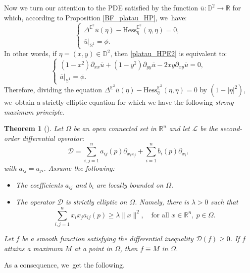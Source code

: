 \documentclass[10pt]{amsart}
\theoremstyle{plain}
\newtheorem{theorem}[cor]{Theorem}
\theoremstyle{definition}
\begin{document}
Now we turn our attention to the PDE satisfied by the function $\overline{u}:\mathbb{D}^2 \to \mathbb{R}$ for which, according to Proposition \ref{BF_platau_HP}, we~have:
\begin{equation}
\begin{cases}\label{platau_HPE2}
\Delta^{\mathbb{E}^2}\overline{u}(\eta) - \mathrm{Hess}_{\eta}^{\mathbb{E}^2}(\eta,\eta) = 0, \\
\overline{u}|_{\mathbb{S}^1} = \phi.
\end{cases}
\end{equation}
In other words, if $\eta = (x,y) \in \mathbb{D}^2$, then \eqref{platau_HPE2} is equivalent to:
\begin{equation}
\begin{cases}
(1-x^2)\partial_{xx}\overline{u} + (1-y^2)\partial_{yy}\overline{u} - 2xy\partial_{xy}\overline{u} = 0, \\
\overline{u}|_{\mathbb{S}^1} = \phi.
\end{cases}
\end{equation}
Therefore, dividing the equation $\Delta^{\mathbb{E}^2}\overline{u}(\eta) - \mathrm{Hess}_{\eta}^{\mathbb{E}^2}(\eta,\eta) = 0$ by $(1-\lvert\eta\rvert^2)$, we~obtain a strictly elliptic equation for which we have the following \emph{strong maximum principle}.

\begin{theorem}[{\cite[\S 3]{Protter1967MaximumPI}}]\label{Strong_Max_P}
Let $\Omega$ be an open connected set in $\mathbb{R}^n$ and let $\mathcal{L}$ be the second-order differential operator:
\[
\mathcal{D} = \sum_{i,j=1}^{n}a_{ij}(p)\partial_{x_ix_j} + \sum_{i=1}^nb_i(p)\partial_{x_i},
\]
with $a_{ij} = a_{ji}$. Assume the following:
\begin{itemize}
\item The coefficients $a_{ij}$ and $b_i$ are locally bounded on $\Omega$.
\item The operator $\mathcal{D}$ is \emph{strictly elliptic} on $\Omega$. Namely, there is $\lambda > 0$ such that
\[
\sum_{i,j=1}^{n} x_i x_j a_{ij}(p) \geq \lambda \lVert x \rVert^2, \quad \text{for all } x \in \mathbb{R}^n, \ p \in \Omega.
\]
\end{itemize}
Let $f$ be a smooth function satisfying the differential inequality $\mathcal{D}(f) \geq 0$. If $f$ attains a maximum $M$ at a point in $\Omega$, then $f \equiv M$ in $\Omega$.
\end{theorem}

As a consequence, we~get the following.
\end{document}
